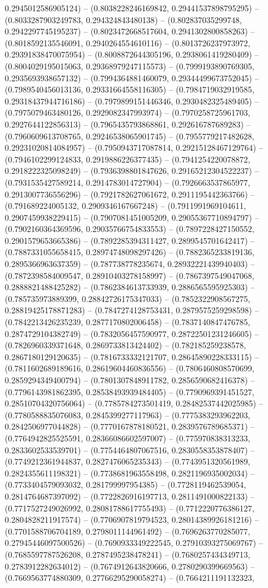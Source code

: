 0.2945012586905124) -- (0.8038228246169842, 0.29441537898795295) -- (0.8033287903249783, 0.294324843480138) -- (0.802837035299748, 0.2942297745195237) -- (0.8023472668517604, 0.2941302800858263) -- (0.8018592135546091, 0.2940264554610116) -- (0.8013726237973972, 0.29391838470075954) -- (0.8008872644305196, 0.2938061419280409) -- (0.8004029195015063, 0.29368979247115573) -- (0.7999193890769305, 0.2935693938657132) -- (0.7994364881460079, 0.29344499673752045) -- (0.7989540456013136, 0.29331664558116305) -- (0.7984719032919585, 0.29318437944716186) -- (0.7979899151446346, 0.2930482325489405) -- (0.7975079463480126, 0.2929082347993974) -- (0.7970258725961703, 0.2927644122856313) -- (0.7965435793868861, 0.292616787689283) -- (0.7960609613708765, 0.29246538065901745) -- (0.7955779217482628, 0.29231020814084957) -- (0.7950943717087814, 0.29215128467129764) -- (0.7946102299124833, 0.2919886226377435) -- (0.7941254220078872, 0.2918222325098249) -- (0.7936398801847626, 0.29165212304522237) -- (0.7931535427589214, 0.2914783014727904) -- (0.7926663537865977, 0.2913007736556296) -- (0.7921782627061672, 0.2911195442363766) -- (0.791689224005132, 0.2909346167667248) -- (0.7911991969104611, 0.2907459938229415) -- (0.7907081451005209, 0.29055367710894797) -- (0.7902160364369596, 0.29035766754833553) -- (0.7897228427150552, 0.2901579653665386) -- (0.7892285394311427, 0.2899545701642417) -- (0.7887331055658415, 0.28974748098297426) -- (0.7882365233819136, 0.2895366963637359) -- (0.787738778235674, 0.28932221439940403) -- (0.7872398584009547, 0.28910403278158997) -- (0.7867397549047068, 0.2888821488425282) -- (0.7862384613733939, 0.2886565595925303) -- (0.785735973889399, 0.28842726175347033) -- (0.7852322908567275, 0.28819425178871283) -- (0.7847274128753431, 0.2879575259298598) -- (0.7842213426235239, 0.2877170802006458) -- (0.7837140847476785, 0.2874729104382749) -- (0.7832056457590977, 0.28722501231246605) -- (0.7826960339371648, 0.2869733813424402) -- (0.782185259238578, 0.2867180129120635) -- (0.7816733332121707, 0.28645890228333115) -- (0.7811602689189616, 0.28619604460836556) -- (0.7806460808570699, 0.2859294349400794) -- (0.7801307848911782, 0.2856590682416378) -- (0.7796143981862395, 0.28538493939484405) -- (0.7790969391451527, 0.28510704320756064) -- (0.7785784273501419, 0.28482537442025985) -- (0.7780588835076083, 0.2845399277117963) -- (0.7775383293962203, 0.2842506977044828) -- (0.7770167878180521, 0.2839576789685371) -- (0.7764942825525591, 0.28366086602597007) -- (0.775970838313233, 0.2833602533539701) -- (0.7754464807067516, 0.2830558353878407) -- (0.7749212361944837, 0.2827476065235343) -- (0.7743951320561989, 0.2824355611198321) -- (0.7738681963558498, 0.2821196935002034) -- (0.7733404579093032, 0.281799997954385) -- (0.7728119462539054, 0.2814764687397092) -- (0.7722826916197713, 0.2811491000822133) -- (0.7717527249026992, 0.28081788617755493) -- (0.7712220776386127, 0.2804828211917574) -- (0.7706907819794523, 0.28014389926181216) -- (0.7701588706704189, 0.2798011144961492) -- (0.7696263770285077, 0.27945446097500526) -- (0.7690933349222545, 0.27910393275069767) -- (0.7685597787526208, 0.2787495238478241) -- (0.7680257434349713, 0.2783912282634012) -- (0.7674912643820666, 0.2780290399669563) -- (0.7669563774880309, 0.27766295290058274) -- (0.7664211191132323, 